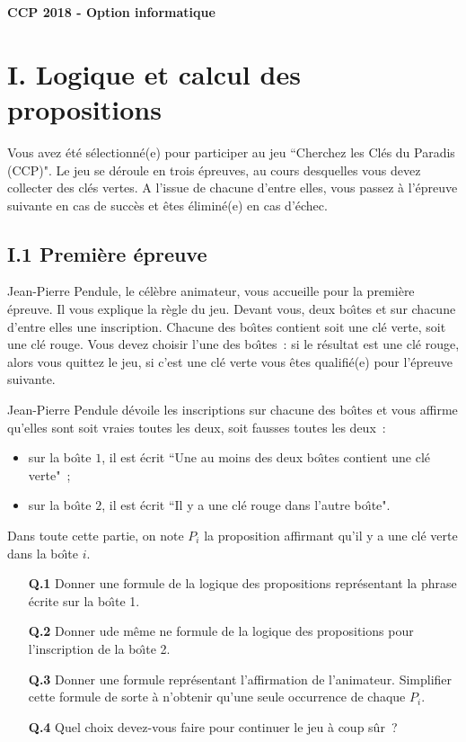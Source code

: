 \documentclass[11pt,a4paper]{article}\nofiles
\begin{document}
\begin{center}
{\bf \Large CCP 2018 - Option informatique}
\end{center}

\section*{I. Logique et calcul des propositions}
Vous avez \'et\'e s\'electionn\'e(e) pour participer au jeu ``Cherchez les Cl\'es du Paradis (CCP)". 
Le jeu se d\'eroule en trois \'epreuves, au cours desquelles vous devez collecter des cl\'es vertes. 
A l'issue de chacune d'entre elles, vous passez \`a l'\'epreuve suivante en cas de succ\`es et \^etes \'elimin\'e(e) en cas d'\'echec.

\subsection*{I.1 Premi\`ere \'epreuve}
Jean-Pierre Pendule, le c\'el\`ebre animateur, vous accueille pour la premi\`ere \'epreuve. 
Il vous explique la r\`egle du jeu. 
Devant vous, deux bo\^\i tes et sur chacune d'entre elles une inscription. 
Chacune des bo\^\i tes contient soit une cl\'e verte, soit une cl\'e rouge. 
Vous devez choisir l'une des bo\^\i tes~: si le r\'esultat est une cl\'e rouge, alors vous quittez le jeu, si c'est une cl\'e verte vous \^etes qualifi\'e(e) pour l'\'epreuve suivante.

Jean-Pierre Pendule d\'evoile les inscriptions sur chacune des bo\^\i tes et vous affirme qu'elles sont soit vraies toutes les deux, soit fausses toutes les deux~:
\begin{itemize}
\item sur la bo\^\i te $1$, il est \'ecrit ``Une au moins des deux bo\^\i tes contient une cl\'e verte"~;
\item  sur la bo\^\i te $2$, il est \'ecrit ``Il y a une cl\'e rouge dans l'autre bo\^\i te".
\end{itemize}
Dans toute cette partie, on note $P_i$ la proposition affirmant qu'il y a une cl\'e verte dans la bo\^\i te $i$.
\begin{enumerate}
\item[{\bf Q.1}] Donner une formule de la logique des propositions repr\'esentant la phrase \'ecrite sur la bo\^\i te 1.
\item[{\bf Q.2}] Donner ude m\^eme ne formule de la logique des propositions pour l'inscription de la bo\^\i te 2.
\item[{\bf Q.3}] Donner une formule repr\'esentant l'affirmation de l'animateur. Simplifier cette formule de sorte \`a n'obtenir qu'une seule occurrence de chaque $P_i$.
\item[{\bf Q.4}] Quel choix devez-vous faire pour continuer le jeu \`a coup s\^ur~?
\end{enumerate}
\end{document}
